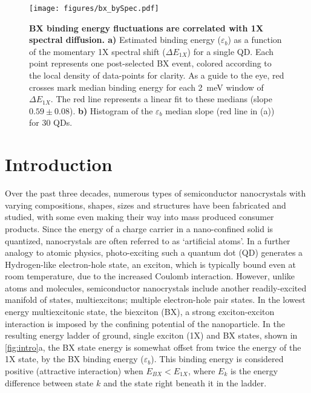 \documentclass[journal=nalefd, manuscript=letter, layout=twocolumn]{achemso}
\begin{document}
\begin{figure}[t]
    \centering
    \texttt{[image: figures/bx\_bySpec.pdf]}
    \caption{\textbf{BX binding energy fluctuations are correlated with 1X spectral diffusion. a)} Estimated binding energy ($\varepsilon_b$) as a function of the momentary 1X spectral shift ($\Delta E_{1X}$) for a single QD. Each point represents one post-selected BX event, colored according to the local density of data-points for clarity. As a guide to the eye, red crosses mark median binding energy for each \SI{2}{meV} window of $\Delta E_{1X}$. The red line represents a linear fit to these medians (slope $0.59\pm0.08$). \textbf{b)} Histogram of the $\varepsilon_b$ median slope (red line in (a)) for 30 QDs.}
    \label{fig:bx_bySpec}
\end{figure}


\section*{Introduction}
Over the past three decades, numerous types of semiconductor nanocrystals with varying compositions, shapes, sizes and structures have been fabricated and studied\cite{Murray2000,Kagan2016,Kovalenko2017}, with some even making their way into mass produced consumer products\cite{Jang2010}. Since the energy of a charge carrier in a nano-confined solid is quantized, nanocrystals are often referred to as `artificial atoms'. In a further analogy to atomic physics, photo-exciting such a quantum dot (QD) generates a Hydrogen-like electron-hole state, an exciton, which is typically bound even at room temperature, due to the increased Coulomb interaction. 
However, unlike atoms and molecules, semiconductor nanocrystals include another readily-excited manifold of states, multiexcitons; multiple electron-hole pair states\cite{Klimov2007}. In the lowest energy multiexcitonic state, the biexciton (BX), a strong exciton-exciton interaction is imposed by the confining potential of the nanoparticle. In the resulting energy ladder of ground, single exciton (1X) and BX states, shown in \autoref{fig:intro}a, the BX state energy is somewhat offset from twice the energy of the 1X state, by the BX binding energy ($\varepsilon_b$)\cite{Klimov2007}. This binding energy is considered positive (attractive interaction) when $E_{BX}<E_{1X}$, where $E_k$ is the energy difference between state $k$ and the state right beneath it in the ladder. 
\end{document}
